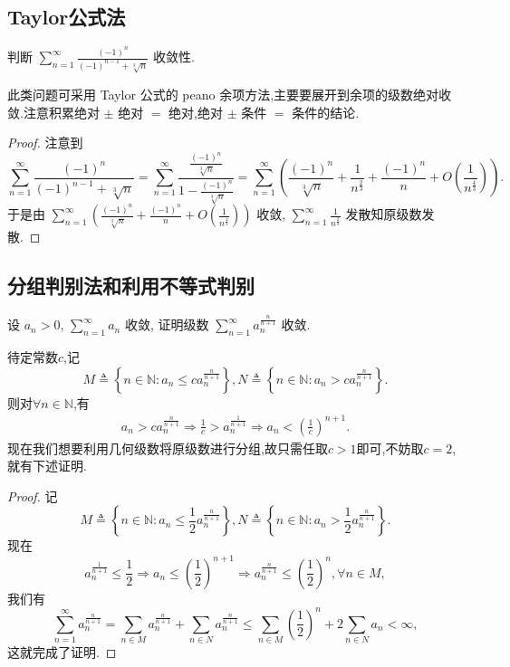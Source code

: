 \documentclass[../../main.tex]{subfiles}%
\begin{document}
\subsection{Taylor公式法}

\begin{example}
判断 $\sum_{n=1}^{\infty} \frac{(-1)^n}{(-1)^{n - 1} + \sqrt[3]{n}}$ 收敛性.
\end{example}
\begin{note}
此类问题可采用 Taylor 公式的 peano 余项方法,主要要展开到余项的级数绝对收敛.注意积累绝对 $\pm$ 绝对 $=$ 绝对,绝对 $\pm$ 条件 $=$ 条件的结论.
\end{note}
\begin{proof}
注意到
\[
\sum_{n=1}^{\infty} \frac{(-1)^n}{(-1)^{n - 1} + \sqrt[3]{n}} = \sum_{n=1}^{\infty} \frac{\frac{(-1)^n}{\sqrt[3]{n}}}{1 - \frac{(-1)^n}{\sqrt[3]{n}}} = \sum_{n=1}^{\infty} \left( \frac{(-1)^n}{\sqrt[3]{n}} + \frac{1}{n^{\frac{2}{3}}} + \frac{(-1)^n}{n} + O \left( \frac{1}{n^{\frac{4}{3}}} \right) \right).
\]
于是由 $\sum_{n=1}^{\infty} \left( \frac{(-1)^n}{\sqrt[3]{n}} + \frac{(-1)^n}{n} + O \left( \frac{1}{n^{\frac{4}{3}}} \right) \right)$ 收敛, $\sum_{n=1}^{\infty} \frac{1}{n^{\frac{2}{3}}}$ 发散知原级数发散.
\end{proof}



\subsection{分组判别法和利用不等式判别}

\begin{example}
设 $a_n > 0$, $\sum_{n=1}^{\infty} a_n$ 收敛, 证明级数 $\sum_{n=1}^{\infty} a_n^{\frac{n}{n + 1}}$ 收敛.
\end{example}
\begin{note}
待定常数$c$,记
\[
M\triangleq \left\{ n\in \mathbb{N} :a_n\leqslant ca_{n}^{\frac{n}{n+1}} \right\} ,N\triangleq \left\{ n\in \mathbb{N} :a_n>ca_{n}^{\frac{n}{n+1}} \right\} .
\]
则对$\forall n\in \mathbb{N}$,有
\begin{align*}
a_n>ca_{n}^{\frac{n}{n+1}}\Rightarrow \frac{1}{c}>a_{n}^{\frac{1}{n+1}} \Rightarrow a_n<\left( \frac{1}{c} \right) ^{n+1}.
\end{align*}
现在我们想要利用几何级数将原级数进行分组,故只需任取$c>1$即可,不妨取$c=2$,就有下述证明.
\end{note}
\begin{proof}
记
\[
M \triangleq \left\{ n \in \mathbb{N} : a_n \leqslant \frac{1}{2} a_n^{\frac{n}{n + 1}} \right\}, N \triangleq \left\{ n \in \mathbb{N} : a_n > \frac{1}{2} a_n^{\frac{n}{n + 1}} \right\}.
\]
现在
\[
a_n^{\frac{1}{n + 1}} \leqslant \frac{1}{2} \Rightarrow a_n \leqslant \left( \frac{1}{2} \right)^{n + 1} \Rightarrow a_n^{\frac{n}{n + 1}} \leqslant \left( \frac{1}{2} \right)^n, \forall n \in M,
\]
我们有
\[
\sum_{n=1}^{\infty} a_n^{\frac{n}{n + 1}} = \sum_{n \in M} a_n^{\frac{n}{n + 1}} + \sum_{n \in N} a_n^{\frac{n}{n + 1}} \leqslant \sum_{n \in M} \left( \frac{1}{2} \right)^n + 2 \sum_{n \in N} a_n < \infty,
\]
这就完成了证明.
\end{proof}
\end{document}
